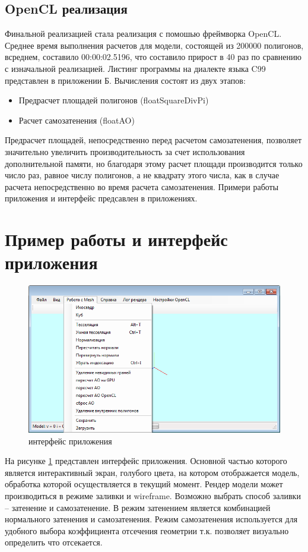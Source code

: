\subsection{OpenCL реализация}
Финальной реализацией стала реализация с помошью фреймворка OpenCL. Среднее время выполнения расчетов для модели, состоящей из 200000 полигонов, всреднем, составило 00:00:02.5196, что составило прирост в 40 раз по сравнению с изначальной реализацией.  Листинг программы на диалекте языка C99 представлен в приложении Б. Вычисления состоят из двух этапов:
\begin{itemize}
\item Предрасчет площадей полигонов (floatSquareDivPi)
\item Расчет самозатенения (floatAO)
\end{itemize}

Предрасчет площадей, непосредственно перед расчетом самозатенения, позволяет значительно увеличить производительность за счет использования дополнительной памяти, но благодаря этому расчет площади производится только число раз, равное числу полигонов, а не квадрату этого числа, как в случае расчета непосредственно во время расчета самозатенения. Примери работы приложения и интерфейс предсавлен в приложениях.

\clearpage
\section{Пример работы и интерфейс приложения}
\begin{figure}[h]
	\center
	\includegraphics[width=1\textwidth]{int}
	\caption{интерфейс приложения}\label{interface}
\end{figure}
На рисунке \ref{interface} представлен интерфейс приложения. Основной частью которого является интерактивный экран, голубого цвета, на котором отображается модель, обработка которой осуществляется в текущий момент. Рендер модели может производиться в режиме заливки и wireframe. Возможно выбрать способ заливки -- затенение и самозатенение. В режим затенением является комбинацией нормального затенения и самозатенения. Режим самозатенения используется для удобного выбора коэффициента отсечения геометрии т.к. позволяет визуально определить что отсекается.

